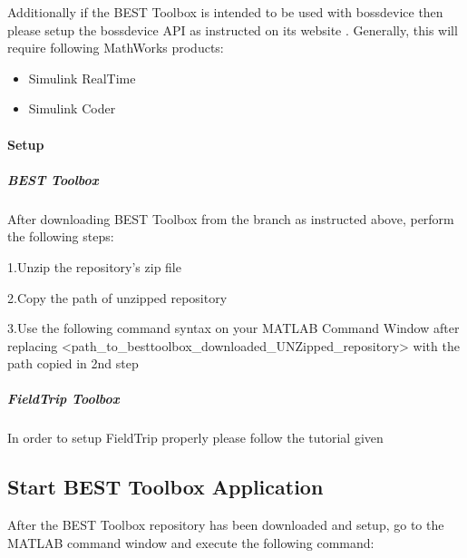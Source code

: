 \documentclass[letterpaper,10pt,english]{sphinxmanual}
\begin{document}
\sphinxAtStartPar
Additionally if the BEST Toolbox is intended to be used with bossdevice then please setup the bossdevice API as instructed on its website .  Generally, this will require following MathWorks products:
\begin{itemize}
\item {} 
\sphinxAtStartPar
Simulink Real\sphinxhyphen{}Time

\item {} 
\sphinxAtStartPar
Simulink Coder

\end{itemize}


\paragraph{Setup}
\label{\detokenize{2_DownloadAndSetup:setup}}

\subparagraph{BEST Toolbox}
\label{\detokenize{2_DownloadAndSetup:best-toolbox}}
\sphinxAtStartPar
After downloading BEST Toolbox from the branch as instructed above, perform the following steps:

\sphinxAtStartPar
1.Unzip the repository’s zip file

\sphinxAtStartPar
2.Copy the path of unzipped repository

\sphinxAtStartPar
3.Use the following command syntax on your MATLAB Command Window after replacing \textless{}path\_to\_besttoolbox\_downloaded\_UNZipped\_repository\textgreater{} with the path copied in 2nd step

\begin{sphinxVerbatim}[commandchars=\\\{\}]
\end{sphinxVerbatim}


\subparagraph{FieldTrip Toolbox}
\label{\detokenize{2_DownloadAndSetup:fieldtrip-toolbox}}
\sphinxAtStartPar
In order to setup FieldTrip properly please follow the tutorial given 


\subsection{Start BEST Toolbox Application}
\label{\detokenize{3_StartBESTToolboxApplication:start-best-toolbox-application}}\label{\detokenize{3_StartBESTToolboxApplication::doc}}
\sphinxAtStartPar
After the BEST Toolbox repository has been downloaded and setup, go to the MATLAB command window and execute the following command:
\end{document}
